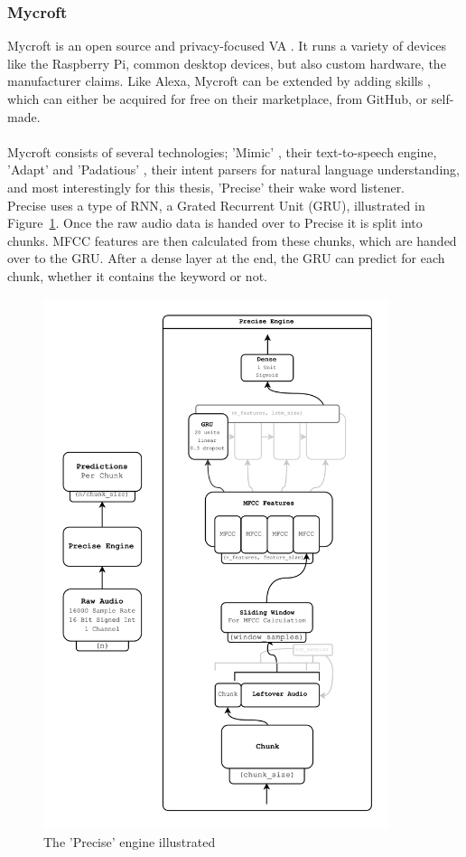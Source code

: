 \subsubsection{Mycroft}

Mycroft is an open source \cite{mycroft_gh} and privacy-focused VA \cite{mycroft}.
It runs a variety of devices like the Raspberry Pi, common desktop devices, but also custom hardware, the manufacturer claims.
Like Alexa, Mycroft can be extended by adding skills \cite{mycroft_skills}, which can either be acquired for free on their marketplace,
from GitHub, or self-made.\\\\
Mycroft consists of several technologies; 'Mimic' \cite{mycroft_mimic3}, their text-to-speech engine, 'Adapt' \cite{mycroft_adapt} and 'Padatious' \cite{mycroft_padatious},
their intent parsers for natural language understanding, and most interestingly for this thesis, 'Precise' \cite{mycroft_precise} their wake word listener.\\
Precise uses a type of RNN, a Grated Recurrent Unit (GRU), illustrated in Figure~\ref{fig:precise_gru}.
Once the raw audio data is handed over to Precise it is split into chunks.
MFCC features are then calculated from these chunks, which are handed over to the GRU.
After a dense layer at the end, the GRU can predict for each chunk, whether it contains the keyword or not.


\begin{figure}[htb]
    \centering
    \includegraphics[width=0.9\textwidth]{figures/precise_engine.PNG}
    \caption[Illustration: The 'Precise' engine \cite{mycroft_precise}]{The 'Precise' engine illustrated}
    \label{fig:precise_gru}
\end{figure}
